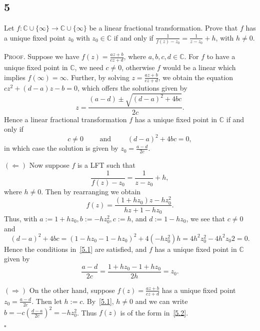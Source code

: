 \documentclass[12pt]{article}
\newcounter{ProofCounter}
\newenvironment{Proof}{\stepcounter{ProofCounter}\textsc{Proof.}}{\hfill$\square$}
\begin{document}
\newpage
\subsection*{5}
\begin{tcolorbox}
  Let $f : \mathbb{C} \cup \{\infty\} \rightarrow \mathbb{C}\cup \{\infty\}$ be a linear fractional transformation. Prove that $f$ has a unique fixed
  point $z_0$ with $z_0 \in \mathbb{C}$ if and only if $\frac{1}{f(z) - z_0} = \frac{1}{z - z_0} + h$, with $h \neq 0$.
\end{tcolorbox}
\begin{Proof}
  Suppose we have $f(z) = \frac{az + b}{cz + d}$, where $a,b,c,d \in \mathbb{C}$. For $f$ to have a unique fixed point in $\mathbb{C}$, we need $c
  \neq 0$, otherwise $f$ would be a linear which implies $f(\infty) = \infty$. Further, by solving $z = \frac{az + b}{cz + d}$, we obtain the equation 
  $cz^{2} + (d - a)z - b = 0$, which offers the solutions given by
  \[ z = \frac{(a-d) \pm \sqrt{(d - a)^{2} + 4bc}}{2c}. \]
  Hence a linear fractional transformation $f$ has a unique fixed point in $\mathbb{C}$ if and only if 
  \begin{equation}
    c \neq 0\qquad \text{ and } \qquad (d - a)^{2} + 4bc = 0,
    \label{5.1}
  \end{equation}
  in which case the solution is given by $z_0 = \frac{a - d}{2c}$.

  \vspace{5mm}
  $(\Leftarrow)$ Now suppose $f$ is a LFT such that 
  \[ \frac{1}{f(z) - z_0} = \frac{1}{z - z_0} + h, \]
  where $h \neq 0$. Then by rearranging we obtain
  \begin{equation}
    f(z) = \frac{(1 + hz_0)z - hz_{0}^{2}}{hz + 1 - hz_{0}}.
    \label{5.2}
  \end{equation}
  Thus, with $a := 1 + hz_{0}, b := -hz_{0}^{2}, c := h$, and $d := 1 - hz_{0}$, we see that $c \neq 0$ and 
  \[ (d - a)^{2} + 4bc = (1 - hz_{0} - 1 - hz_{0})^{2} + 4(-hz_{0}^{2})h = 4h^{2}z_{0}^{2} - 4h^{2}z_{0}{2} = 0. \]
  Hence the conditions in~\eqref{5.1} are satisfied, and $f$ has a unique fixed point in $\mathbb{C}$ given by 
  \[
    \frac{a - d}{2c} = \frac{1 + hz_0 - 1 + hz_0}{2h} = z_0.
  \]

  $(\Rightarrow)$ On the other hand, suppose $f(z) = \frac{az + b}{cz + d}$ has a unique fixed point $z_0 = \frac{a - d}{2c}$. Then let $h := c$.
  By~\eqref{5.1}, $h\neq 0$ and we can write $b = -c\left(\frac{d-a}{2c}\right)^{2} = -hz_{0}^{2}$. Thus $f(z)$ is of the form in~\eqref{5.2}.

\end{Proof}
\end{document}
